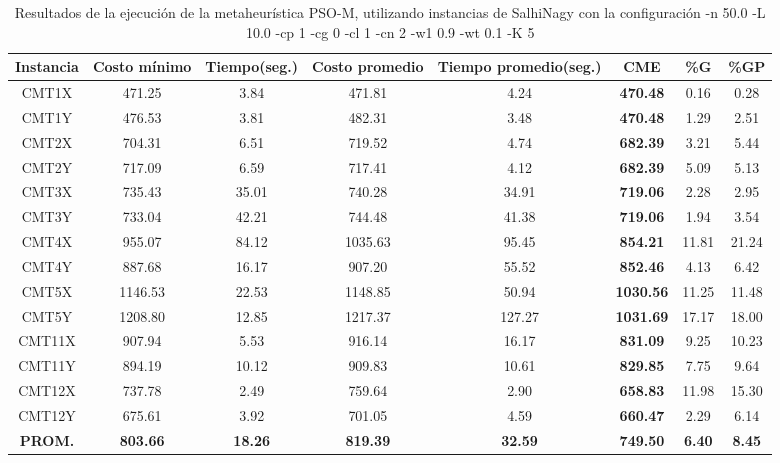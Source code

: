 \begin{table}[h]
\caption{Resultados de la ejecución de la metaheurística PSO-M, utilizando instancias de SalhiNagy con la configuración -n 50.0 -L 10.0 -cp 1 -cg 0 -cl 1 -cn 2 -w1 0.9 -wt 0.1 -K 5}
\centering
\small
\begin{tabular}{c c c c c c c c}
\hline\hline
Instancia & Costo mínimo & Tiempo(seg.) & Costo promedio & Tiempo promedio(seg.) & CME & \%G & \%GP \\ [0.5ex]
\hline
CMT1X & 471.25 & 3.84 & 
471.81 & 4.24 & \bf{470.48} & 
0.16 & 0.28\\CMT1Y & 476.53 & 3.81 & 
482.31 & 3.48 & \bf{470.48} & 
1.29 & 2.51\\CMT2X & 704.31 & 6.51 & 
719.52 & 4.74 & \bf{682.39} & 
3.21 & 5.44\\CMT2Y & 717.09 & 6.59 & 
717.41 & 4.12 & \bf{682.39} & 
5.09 & 5.13\\CMT3X & 735.43 & 35.01 & 
740.28 & 34.91 & \bf{719.06} & 
2.28 & 2.95\\CMT3Y & 733.04 & 42.21 & 
744.48 & 41.38 & \bf{719.06} & 
1.94 & 3.54\\CMT4X & 955.07 & 84.12 & 
1035.63 & 95.45 & \bf{854.21} & 
11.81 & 21.24\\CMT4Y & 887.68 & 16.17 & 
907.20 & 55.52 & \bf{852.46} & 
4.13 & 6.42\\CMT5X & 1146.53 & 22.53 & 
1148.85 & 50.94 & \bf{1030.56} & 
11.25 & 11.48\\CMT5Y & 1208.80 & 12.85 & 
1217.37 & 127.27 & \bf{1031.69} & 
17.17 & 18.00\\CMT11X & 907.94 & 5.53 & 
916.14 & 16.17 & \bf{831.09} & 
9.25 & 10.23\\CMT11Y & 894.19 & 10.12 & 
909.83 & 10.61 & \bf{829.85} & 
7.75 & 9.64\\CMT12X & 737.78 & 2.49 & 
759.64 & 2.90 & \bf{658.83} & 
11.98 & 15.30\\CMT12Y & 675.61 & 3.92 & 
701.05 & 4.59 & \bf{660.47} & 
2.29 & 6.14\\\bf{PROM.} & 
\bf{803.66} & \bf{18.26} & \bf{819.39} & \bf{32.59} & \bf{749.50} & \bf{6.40} & \bf{8.45}\\[1ex]\hline
\end{tabular}
\label{table:nonlin}
\end{table}
